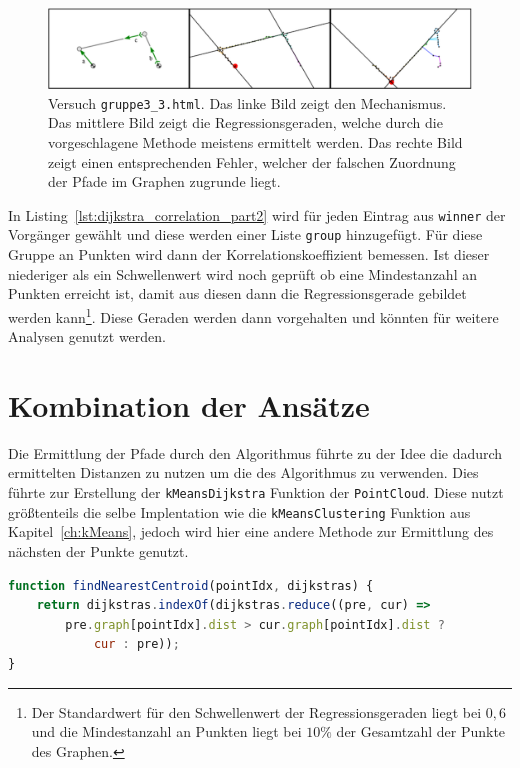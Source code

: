 \begin{figure}
    \centering
    \includegraphics[width=\textwidth]{gfx/correlation_edit.png}
    \caption[Versuch \lstinline{gruppe3_3.html}]{Versuch \lstinline{gruppe3_3.html}. Das linke Bild zeigt den Mechanismus. Das mittlere Bild zeigt die Regressionsgeraden, welche durch die vorgeschlagene Methode meistens ermittelt werden. Das rechte Bild zeigt einen entsprechenden Fehler, welcher der falschen Zuordnung der Pfade im Graphen zugrunde liegt.}
    \label{fig:gruppe3_3}
\end{figure}

In Listing~\ref{lst:dijkstra_correlation_part2} wird für jeden Eintrag aus \lstinline{winner} der Vorgänger gewählt und diese werden einer Liste \lstinline{group} hinzugefügt.
Für diese Gruppe an Punkten wird dann der Korrelationskoeffizient bemessen.
Ist dieser niederiger als ein Schwellenwert wird noch geprüft ob eine Mindestanzahl an Punkten erreicht ist, damit aus diesen dann die Regressionsgerade gebildet werden kann\footnote{Der Standardwert für den Schwellenwert der Regressionsgeraden liegt bei $0,6$ und die Mindestanzahl an Punkten liegt bei $10\%$ der Gesamtzahl der Punkte des Graphen.}.
Diese Geraden werden dann vorgehalten und könnten für weitere Analysen genutzt werden.

\section{Kombination der Ansätze}

Die Ermittlung der Pfade durch den  Algorithmus führte zu der Idee die dadurch ermittelten Distanzen zu nutzen um die  des  Algorithmus zu verwenden.
Dies führte zur Erstellung der \lstinline{kMeansDijkstra} Funktion der \lstinline{PointCloud}.
Diese nutzt größtenteils die selbe Implentation wie die \lstinline{kMeansClustering} Funktion aus Kapitel~\ref{ch:kMeans}, jedoch wird hier eine andere Methode zur Ermittlung des nächsten  der Punkte genutzt.

\begin{lstlisting}[language=JavaScript, caption={Bestimmung des nächsten \name{Centroids} in der \lstinline{kMeansDijkstra} Funktion.}, label={lst:findNearestCentroidDijkstra}]
function findNearestCentroid(pointIdx, dijkstras) {
    return dijkstras.indexOf(dijkstras.reduce((pre, cur) =>
        pre.graph[pointIdx].dist > cur.graph[pointIdx].dist ?
            cur : pre));
}
\end{lstlisting}

